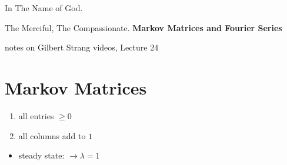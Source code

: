 \documentclass[a4paper,12pt]{article}
\theoremstyle{definition} \newtheorem{Theorem}{Theorem}
\begin{document}
\begin{center}
In The Name of God.

The Merciful, The Compassionate.
\vskip 1cm
{\Large\bfseries{Markov Matrices and Fourier Series}}

\vskip 0.2cm
\tiny{notes on Gilbert Strang videos, Lecture 24}
\end{center}

\section{Markov Matrices}
\begin{enumerate}
\item all entries $\geq 0$
\item all columns add to $1$
\end{enumerate}
\begin{itemize}
	\item steady state: $\rightarrow \lambda = 1$
\end{itemize}
\end{document}
